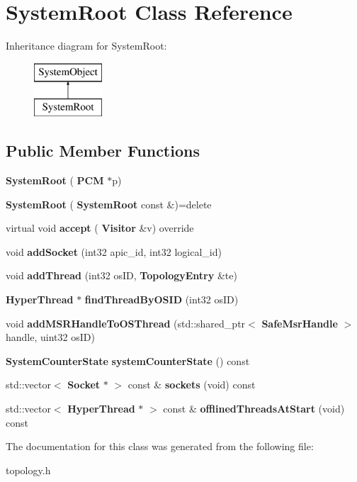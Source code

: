\section{System\+Root Class Reference}
\label{classSystemRoot}
Inheritance diagram for System\+Root\+:\begin{figure}[H]
\begin{center}
\leavevmode
\includegraphics[height=2.000000cm]{classSystemRoot}
\end{center}
\end{figure}
\subsection*{Public Member Functions}
\begin{DoxyCompactItemize}
\item 
\mbox{\label{classSystemRoot_a41932bf80f8fa1acedc3298a0bd8fcb3}} 
{\bfseries System\+Root} (\textbf{ P\+CM} $\ast$p)
\item 
\mbox{\label{classSystemRoot_adcf0f53283651a42c89367f07391b02d}} 
{\bfseries System\+Root} (\textbf{ System\+Root} const \&)=delete
\item 
\mbox{\label{classSystemRoot_ac611108c65d7c0deeb02d849a985dfdd}} 
virtual void {\bfseries accept} (\textbf{ Visitor} \&v) override
\item 
\mbox{\label{classSystemRoot_ac4d0ee3296fdd74a455c9e28daf2f1b0}} 
void {\bfseries add\+Socket} (int32 apic\+\_\+id, int32 logical\+\_\+id)
\item 
\mbox{\label{classSystemRoot_a718d51f036df54ff1de8850f4527ff11}} 
void {\bfseries add\+Thread} (int32 os\+ID, \textbf{ Topology\+Entry} \&te)
\item 
\mbox{\label{classSystemRoot_a2f0f50d2f72c5d73d0207f6b205861cb}} 
\textbf{ Hyper\+Thread} $\ast$ {\bfseries find\+Thread\+By\+O\+S\+ID} (int32 os\+ID)
\item 
\mbox{\label{classSystemRoot_a471431df3e061557de500c788e81f95a}} 
void {\bfseries add\+M\+S\+R\+Handle\+To\+O\+S\+Thread} (std\+::shared\+\_\+ptr$<$ \textbf{ Safe\+Msr\+Handle} $>$ handle, uint32 os\+ID)
\item 
\mbox{\label{classSystemRoot_a4e0d1d1f77e3a51b5d463dbc40c1624f}} 
\textbf{ System\+Counter\+State} {\bfseries system\+Counter\+State} () const
\item 
\mbox{\label{classSystemRoot_a5fce3de9bcca293a7413a681035a9e1b}} 
std\+::vector$<$ \textbf{ Socket} $\ast$ $>$ const  \& {\bfseries sockets} (void) const
\item 
\mbox{\label{classSystemRoot_a23a38c2f9aa51406a1288b6a3d047f7f}} 
std\+::vector$<$ \textbf{ Hyper\+Thread} $\ast$ $>$ const  \& {\bfseries offlined\+Threads\+At\+Start} (void) const
\end{DoxyCompactItemize}


The documentation for this class was generated from the following file\+:\begin{DoxyCompactItemize}
\item 
topology.\+h\end{DoxyCompactItemize}

